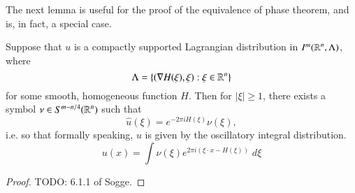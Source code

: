 
The next lemma is useful for the proof of the equivalence of phase theorem, and is, in fact, a special case.

\begin{lemma}
    Suppose that $u$ is a compactly supported Lagrangian distribution in $I^m(\operatorname{\mathbb{R}}^n, \Lambda)$, where
    \[ \Lambda = \{ (\nabla H(\xi), \xi) : \xi \in \operatorname{\mathbb{R}}^n \} \]
    for some smooth, homogeneous function $H$. Then for $|\xi| \geq 1$, there exists a symbol $\nu \in S^{m-n/4}(\operatorname{\mathbb{R}}^n)$ such that
    \[ \widehat{u}(\xi) = e^{- 2 \pi i H(\xi)} \nu(\xi), \]
    i.e. so that formally speaking, $u$ is given by the oscillatory integral distribution.
    \[ u(x) = \int \nu(\xi) e^{2 \pi i (\xi \cdot x - H(\xi))}\; d\xi \]
\end{lemma}
\begin{proof}
    TODO: 6.1.1 of Sogge.
\end{proof}

